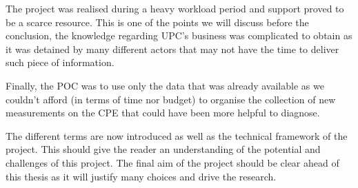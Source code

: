 The project was realised during a heavy workload period and support proved to be a scarce resource. This is one of the points we will discuss before the conclusion, the knowledge regarding UPC’s business was complicated to obtain as it was detained by many different actors that may not have the time to deliver such piece of information. 

Finally, the POC was to use only the data that was already available as we couldn't afford (in terms of time nor budget) to organise the collection of new measurements on the CPE that could have been more helpful to diagnose.

\vspace{1\baselineskip}
The different terms are now introduced as well as the technical framework of the project. This should give the reader an understanding of the potential and challenges of this project. The final aim of the project should be clear ahead of this thesis as it will justify many choices and drive the research.

